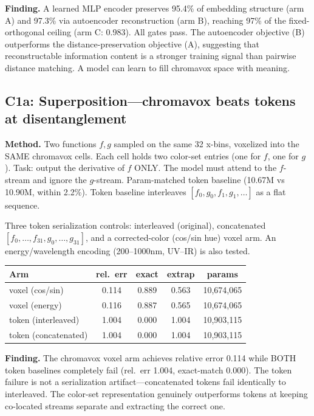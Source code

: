 \documentclass[11pt,a4paper]{article}
\begin{document}
\textbf{Finding.} A learned MLP encoder preserves 95.4\% of embedding structure (arm A) and 97.3\% via autoencoder reconstruction (arm B), reaching 97\% of the fixed-orthogonal ceiling (arm C: 0.983). All gates pass. The autoencoder objective (B) outperforms the distance-preservation objective (A), suggesting that reconstructable information content is a stronger training signal than pairwise distance matching. A model can learn to fill chromavox space with meaning.

\subsection{C1a: Superposition---chromavox beats tokens at disentanglement}

\textbf{Method.} Two functions $f, g$ sampled on the same 32 x-bins, voxelized into the SAME chromavox cells. Each cell holds two color-set entries (one for $f$, one for $g$). Task: output the derivative of $f$ ONLY. The model must attend to the $f$-stream and ignore the $g$-stream. Param-matched token baseline (10.67M vs 10.90M, within 2.2\%). Token baseline interleaves $[f_0, g_0, f_1, g_1, \ldots]$ as a flat sequence.

Three token serialization controls: interleaved (original), concatenated $[f_0, \ldots, f_{31}, g_0, \ldots, g_{31}]$, and a corrected-color (cos/sin hue) voxel arm. An energy/wavelength encoding (200--1000nm, UV--IR) is also tested.

\begin{table}[h]
\centering
\begin{tabular}{lcccc}
\toprule
Arm & rel.\ err & exact & extrap & params \\
\midrule
voxel (cos/sin) & 0.114 & 0.889 & 0.563 & 10,674,065 \\
voxel (energy) & 0.116 & 0.887 & 0.565 & 10,674,065 \\
token (interleaved) & 1.004 & 0.000 & 1.004 & 10,903,115 \\
token (concatenated) & 1.004 & 0.000 & 1.004 & 10,903,115 \\
\bottomrule
\end{tabular}
\end{table}

\textbf{Finding.} The chromavox voxel arm achieves relative error 0.114 while BOTH token baselines completely fail (rel.\ err 1.004, exact-match 0.000). The token failure is not a serialization artifact---concatenated tokens fail identically to interleaved. The color-set representation genuinely outperforms tokens at keeping co-located streams separate and extracting the correct one.
\end{document}
